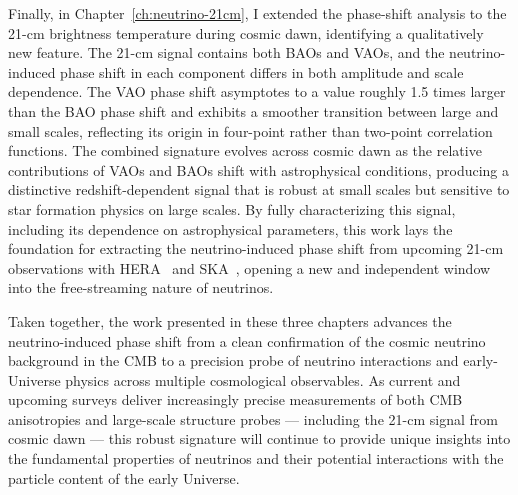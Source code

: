 Finally, in Chapter~\ref{ch:neutrino-21cm}, I extended the phase-shift analysis to the 21-cm brightness temperature during cosmic dawn, identifying a qualitatively new feature. The 21-cm signal contains both BAOs and VAOs, and the neutrino-induced phase shift in each component differs in both amplitude and scale dependence. The VAO phase shift asymptotes to a value roughly 1.5 times larger than the BAO phase shift and exhibits a smoother transition between large and small scales, reflecting its origin in four-point rather than two-point correlation functions. The combined signature evolves across cosmic dawn as the relative contributions of VAOs and BAOs shift with astrophysical conditions, producing a distinctive redshift-dependent signal that is robust at small scales but sensitive to star formation physics on large scales. By fully characterizing this signal, including its dependence on astrophysical parameters, this work lays the foundation for extracting the neutrino-induced phase shift from upcoming 21-cm observations with HERA~\citep{deboer17,hera23} and SKA~\citep{SKA:2018ckk, SKA19}, opening a new and independent window into the free-streaming nature of neutrinos.

Taken together, the work presented in these three chapters advances the neutrino-induced phase shift from a clean confirmation of the cosmic neutrino background in the CMB to a precision probe of neutrino interactions and early-Universe physics across multiple cosmological observables. As current and upcoming surveys deliver increasingly precise measurements of both CMB anisotropies and large-scale structure probes --- including the 21-cm signal from cosmic dawn --- this robust signature will continue to provide unique insights into the fundamental properties of neutrinos and their potential interactions with the particle content of the early Universe.
